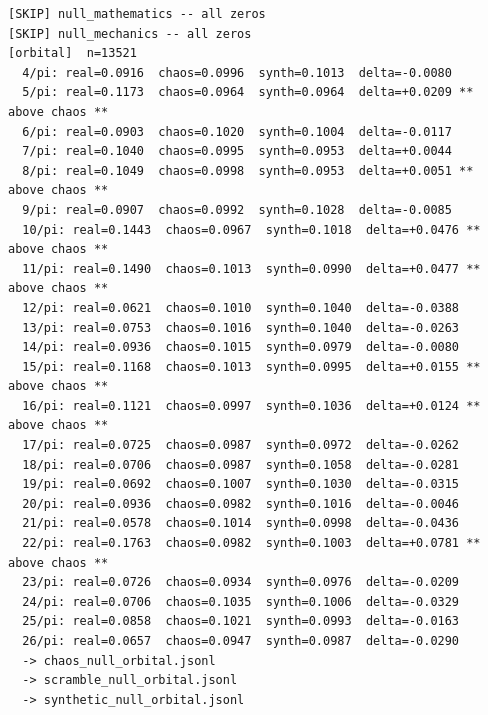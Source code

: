 \documentclass[11pt, letterpaper, openany]{book}
\begin{document}
\begin{empiricalbox}
\begin{lstlisting}[style=terminal]
[SKIP] null_mathematics -- all zeros
[SKIP] null_mechanics -- all zeros
[orbital]  n=13521
  4/pi: real=0.0916  chaos=0.0996  synth=0.1013  delta=-0.0080
  5/pi: real=0.1173  chaos=0.0964  synth=0.0964  delta=+0.0209 ** above chaos **
  6/pi: real=0.0903  chaos=0.1020  synth=0.1004  delta=-0.0117
  7/pi: real=0.1040  chaos=0.0995  synth=0.0953  delta=+0.0044
  8/pi: real=0.1049  chaos=0.0998  synth=0.0953  delta=+0.0051 ** above chaos **
  9/pi: real=0.0907  chaos=0.0992  synth=0.1028  delta=-0.0085
  10/pi: real=0.1443  chaos=0.0967  synth=0.1018  delta=+0.0476 ** above chaos **
  11/pi: real=0.1490  chaos=0.1013  synth=0.0990  delta=+0.0477 ** above chaos **
  12/pi: real=0.0621  chaos=0.1010  synth=0.1040  delta=-0.0388
  13/pi: real=0.0753  chaos=0.1016  synth=0.1040  delta=-0.0263
  14/pi: real=0.0936  chaos=0.1015  synth=0.0979  delta=-0.0080
  15/pi: real=0.1168  chaos=0.1013  synth=0.0995  delta=+0.0155 ** above chaos **
  16/pi: real=0.1121  chaos=0.0997  synth=0.1036  delta=+0.0124 ** above chaos **
  17/pi: real=0.0725  chaos=0.0987  synth=0.0972  delta=-0.0262
  18/pi: real=0.0706  chaos=0.0987  synth=0.1058  delta=-0.0281
  19/pi: real=0.0692  chaos=0.1007  synth=0.1030  delta=-0.0315
  20/pi: real=0.0936  chaos=0.0982  synth=0.1016  delta=-0.0046
  21/pi: real=0.0578  chaos=0.1014  synth=0.0998  delta=-0.0436
  22/pi: real=0.1763  chaos=0.0982  synth=0.1003  delta=+0.0781 ** above chaos **
  23/pi: real=0.0726  chaos=0.0934  synth=0.0976  delta=-0.0209
  24/pi: real=0.0706  chaos=0.1035  synth=0.1006  delta=-0.0329
  25/pi: real=0.0858  chaos=0.1021  synth=0.0993  delta=-0.0163
  26/pi: real=0.0657  chaos=0.0947  synth=0.0987  delta=-0.0290
  -> chaos_null_orbital.jsonl
  -> scramble_null_orbital.jsonl
  -> synthetic_null_orbital.jsonl


\end{lstlisting}
\end{empiricalbox}
\end{document}
